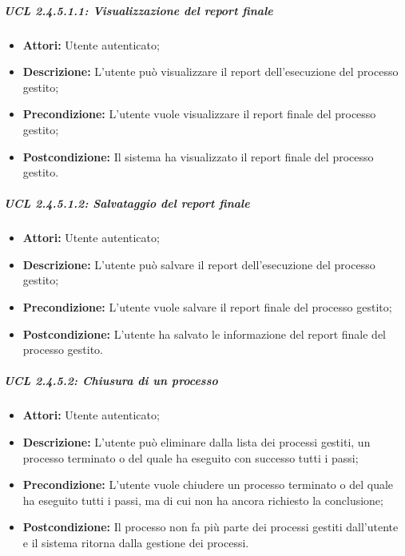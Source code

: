 \subparagraph{UCL 2.4.5.1.1: Visualizzazione del report finale}
\begin{itemize}
\item \textbf{Attori:} Utente autenticato;
\item \textbf{Descrizione:} L'utente può visualizzare il report dell'esecuzione del processo gestito;
\item \textbf{Precondizione:} L'utente vuole visualizzare il report finale del processo gestito;
\item \textbf{Postcondizione:} Il sistema ha visualizzato il report finale del processo gestito.
\end{itemize}

\subparagraph{UCL 2.4.5.1.2: Salvataggio del report finale}
\begin{itemize}
\item \textbf{Attori:} Utente autenticato;
\item \textbf{Descrizione:} L'utente può salvare il report dell'esecuzione del processo gestito;
\item \textbf{Precondizione:} L'utente vuole salvare il report finale del processo gestito;
\item \textbf{Postcondizione:} L'utente ha salvato le informazione del report finale del processo gestito.
\end{itemize}

\subparagraph{UCL 2.4.5.2: Chiusura di un processo}
\begin{itemize}
\item \textbf{Attori:} Utente autenticato;
\item \textbf{Descrizione:} L'utente può eliminare dalla lista dei processi gestiti, un processo terminato o del quale ha eseguito con successo tutti i passi;
\item \textbf{Precondizione:} L'utente vuole chiudere un processo terminato o del quale ha eseguito tutti i passi, ma di cui non ha ancora richiesto la conclusione;
\item \textbf{Postcondizione:} Il processo non fa più parte dei processi gestiti dall'utente e il sistema ritorna dalla gestione dei processi.
\end{itemize}

